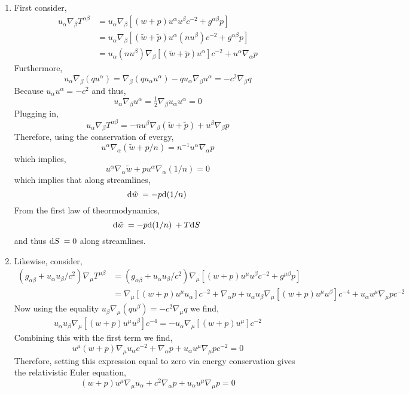 \documentclass[12pt]{article}
\begin{document}
\begin{enumerate}
\item First consider,
\begin{align*}
u_\alpha \nabla_\beta T^{\alpha \beta} & = u_\alpha \nabla_\beta [ (w + p) u^\alpha u^\beta c^{-2} + g^{\alpha \beta} p ] 
\\
& = u_\alpha \nabla_\beta [ (\tilde{w} + \tilde{p}) u^\alpha (nu^\beta) c^{-2} + g^{\alpha \beta} p ] 
\\
& = u_\alpha (n u^\beta) \nabla_\beta [(\tilde{w} + \tilde{p}) u^\alpha] c^{-2} + u^\alpha \nabla_\alpha p 
\end{align*}
Furthermore,
\[ u_\alpha \nabla_\beta (q u^\alpha) = \nabla_\beta (q u_\alpha u^\alpha)- q u_\alpha \nabla_\beta u^\alpha = -c^2 \nabla_\beta q \]
Because $u_\alpha u^\alpha = -c^2$ and thus,
\[ u_{\alpha} \nabla_\beta u^\alpha = \tfrac{1}{2} \nabla_{\beta} u_\alpha u^\alpha = 0 \]
Plugging in, 
\[ u_\alpha \nabla_\beta T^{\alpha \beta} = - n u^\beta \nabla_\beta (\tilde{w} + \tilde{p}) + u^\beta \nabla_\beta p \]
Therefore, using the conservation of evergy,
\[ u^\alpha \nabla_\alpha (\tilde{w} + p/n) = n^{-1}  u^\alpha \nabla_\alpha p \]
which implies,
\[ u^\alpha \nabla_\alpha \tilde{w} + p u^\alpha \nabla_\alpha (1/n) = 0 \]
which implies that along streamlines,
\[ \mathrm{d}\tilde{w} \: = - p \mathrm{d}(1/n) \: \]
From the first law of theormodynamics,
\[ \mathrm{d}\tilde{w} \: = - p \mathrm{d}(1/n) \: + T \mathrm{d}S \: \]
and thus $\mathrm{d}S \: = 0$ along streamlines.

\item Likewise, consider,
\begin{align*}
(g_{\alpha \beta} + u_\alpha u_\beta / c^2) \nabla_\mu T^{\mu \beta} & = (g_{\alpha \beta} + u_\alpha u_\beta / c^2) \nabla_\mu [ (w + p) u^\mu u^\beta c^{-2} + g^{\mu \beta} p ] 
\\
& = \nabla_\mu [(w + p) u^\mu u_\alpha] c^{-2} + \nabla_\alpha p + u_\alpha u_\beta \nabla_\mu [(w + p)u^\mu u^\beta] c^{-4} + u_\alpha u^\mu \nabla_\mu p c^{-2}
\end{align*}
Now using the equality $u_\beta \nabla_\mu (q u^\beta) = -c^2 \nabla_\mu q$ we find,
\begin{align*}
u_\alpha u_\beta \nabla_\mu [(w + p)u^\mu u^\beta] c^{-4} = - u_\alpha \nabla_\mu [(w + p) u^\mu ] c^{-2} 
\end{align*}
Combining this with the first term we find,
\[ u^\mu (w + p) \nabla_\mu u_\alpha c^{-2} + \nabla_\alpha p + u_\alpha u^\mu \nabla_\mu p c^{-2} = 0 \]
Therefore, setting this expression equal to zero via energy conservation gives the relativistic Euler equation,
\[ (w + p) u^\mu \nabla_\mu u_\alpha + c^2 \nabla_\alpha p + u_\alpha u^\mu \nabla_\mu p = 0 \]
\end{enumerate}
\end{document}
